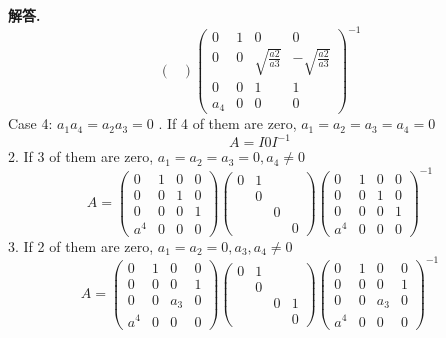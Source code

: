 \documentclass[10pt, a4paper, oneside]{article}
\newenvironment{solution}{\par\noindent\textbf{解答. }}{\par}
\begin{document}
\begin{CJK}{UTF8}{gbsn}
\begin{solution}
$$\begin{pmatrix}
  \end{pmatrix} \begin{pmatrix}
    0 & 1 & 0 & 0 \\
    0 & 0 & \sqrt{\frac{a2}{a3}} & -\sqrt{\frac{a2}{a3}} \\
    0 & 0 & 1 & 1 \\
    a_4 & 0 & 0 & 0
  \end{pmatrix}^{-1}$$
  Case 4: $a_1a_4 = a_2a_3 = 0$ . If 4 of them are zero, $a_1 = a_2 = a_3 = a_4 = 0$ 
  $$A = I0I^{-1}$$
  2. If 3 of them are zero, $a_1 = a_2 = a_3 = 0, a_4 \neq 0 $ \newline
  $$A = \begin{pmatrix}
    0 & 1 & 0 & 0 \\ 
    0 & 0 & 1 & 0 \\
    0 & 0 & 0 & 1 \\
    a^4 & 0 & 0 & 0
  \end{pmatrix} \begin{pmatrix}
    0 & 1 \\ & 0 \\ && 0 \\ &&& 0  
  \end{pmatrix} \begin{pmatrix}
    0 & 1 & 0 & 0 \\ 
    0 & 0 & 1 & 0 \\
    0 & 0 & 0 & 1 \\
    a^4 & 0 & 0 & 0
  \end{pmatrix}^{-1}$$
  3. If 2 of them are zero, $a_1 = a_2 = 0, a_3, a_4 \neq 0 $ \newline
  $$A = \begin{pmatrix}
    0 & 1 & 0 & 0 \\ 
    0 & 0 & 0 & 1 \\
    0 & 0 & a_3 & 0 \\
    a^4 & 0 & 0 & 0
  \end{pmatrix} \begin{pmatrix}
    0 & 1 \\ & 0 \\ && 0 & 1 \\ &&& 0  
  \end{pmatrix} \begin{pmatrix}
    0 & 1 & 0 & 0 \\ 
    0 & 0 & 0 & 1 \\
    0 & 0 & a_3 & 0 \\
    a^4 & 0 & 0 & 0
  \end{pmatrix}^{-1}$$


\end{solution}
\end{CJK}
\end{document}
